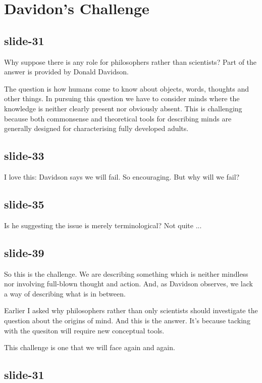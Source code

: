 \documentclass[12pt,\papersize]{extarticle}
\begin{document}
 
\section{Davidon's Challenge}
 
 
 
\subsection{slide-31}
Why suppose there is any role for philosophers rather than scientists? Part of the answer is provided by Donald Davidson.
 
The question is how humans come to know about objects, words, thoughts and other things. In pursuing this question we have to consider minds where the knowledge is neither clearly present nor obviously absent. This is challenging because both commonsense and theoretical tools for describing minds are generally designed for characterising fully developed adults.
 
 
 
\subsection{slide-33}
I love this: Davidson says we will fail. So encouraging. But why will we fail?
 
 
 
\subsection{slide-35}
Is he suggesting the issue is merely terminological? Not quite ...
 
 
 
\subsection{slide-39}
So this is the challenge. We are describing something which is neither mindless nor involving full-blown thought and action. And, as Davidson observes, we lack a way of describing what is in between.
 
Earlier I asked why philosophers rather than only scientists should investigate the question about the origins of mind. And this is the answer. It's because tacking with the quesiton will require new conceptual tools.
 
This challenge is one that we will face again and again.
 
 
 
\subsection{slide-31}
 
\end{document}
